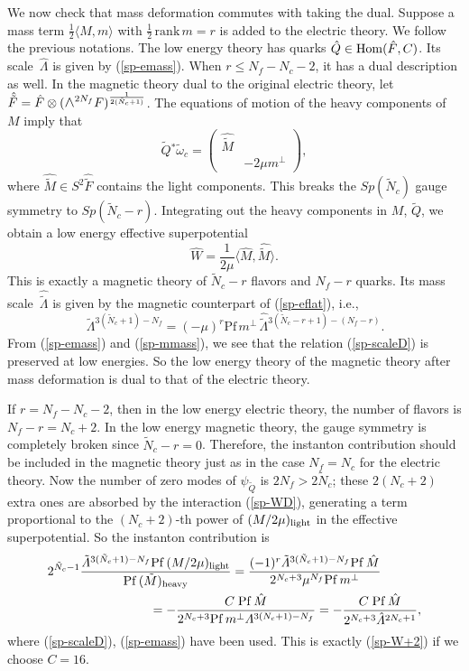 \documentclass[lecture]{qft-l}
\newcommand{\om}{\omega}
\newcommand{\Lam}{\varLambda}
\newcommand{\medwedge}{\mbox{\fontsize{12pt}{0pt}\selectfont $\wedge$}}
\newcommand{\Hom}{{\rm Hom}}
\newcommand{\bra}{\langle}
\newcommand{\ket}{\rangle}
\newcommand{\inv}[1]{\frac{1}{#1}}
\newcommand{\hf}{{\textstyle \inv{2}}}
\newcommand{\rank}{\mathrm{\,rank\,}}
\newcommand{\Pf}{\mathrm{Pf\,}}
\newcommand{\hLam}{\,\hat{\!\Lam}{}}
\newcommand{\tLam}{\,\tilde{\!\Lam}{}}
\newcommand{\htLam}{\,\hat{\tilde{\!\Lam}}{}}
\newcommand{\hF}{\hat{F}{}}
\newcommand{\tM}{\tilde{M}{}}
\newcommand{\tQ}{\tilde{Q}{}}
\newcommand{\tN}{\tilde{N}_c}
\newcommand{\htF}{\hat{\tilde{F}}{}}
\newcommand{\htM}{\hat{\tilde{M}}{}}
\newcommand{\hM}{\hat{M}{}}
\newcommand{\hQ}{\hat{Q}{}}
\newcommand{\tom}{\tilde{\om}_c}
\newcommand{\four}[4]{\left(	\begin{array}{cc}
				{#1}	&	{#2}	\\
				{#3}	&	{#4}
				\end{array}   \right)}
\begin{document}
We now check that mass deformation commutes with taking the dual.
Suppose a mass term $\hf\bra M,m\ket$ with $\hf\rank m=r$
is added to the electric theory.
We follow the previous notations.
The low energy theory has quarks $\hQ\in\Hom(\hF,C)$.
Its scale $\hLam$ is given by (\ref{sp-emass}).
When $r\le N_f-N_c-2$, it has a dual description as well.
In the magnetic theory dual to the original electric theory, let 
$\htF=\hF\otimes(\medwedge^{2N_f}F)^{\inv{2(\tN+1)}}$.
The equations of motion of the heavy components of $M$ imply that
	\begin{equation}
\tQ^*\tom=\four{\htM}{}{}{-2\mu m^\perp},
	\end{equation}
where $\htM\in S^2\htF$ contains the light components.
This breaks the $Sp(\tN)$ gauge symmetry to $Sp(\tN-r)$.
Integrating out the heavy components in $M$, $\tQ$, we obtain
a low energy effective superpotential
	\begin{equation}\label{sp-Wmass}
\hat{W}=\inv{2\mu}\bra\hat{M},\hat{\tilde{M}}\ket.
	\end{equation}
This is exactly a magnetic theory of $\tN-r$ flavors and $N_f-r$ quarks.
Its mass scale $\htLam$ is given by the magnetic counterpart of 
(\ref{sp-eflat}), i.e.,
	\begin{equation}\label{sp-mmass}
\tLam^{3(\tN+1)-N_f}=(-\mu)^r\Pf m^\perp\htLam^{3(\tN-r+1)-(N_f-r)}.
	\end{equation}
{}From (\ref{sp-emass}) and (\ref{sp-mmass}),
we see that the relation (\ref{sp-scaleD}) is preserved at low energies.
So the low energy theory of the magnetic theory after mass deformation is
dual to that of the electric theory.

If $r=N_f-N_c-2$, then in the low energy electric theory, the number of 
flavors is $N_f-r=N_c+2$.
In the low energy magnetic theory, the gauge symmetry is completely 
broken since $\tN-r=0$.
Therefore, the instanton contribution should be included in the magnetic
theory just as in the case $N_f=N_c$ for the electric theory.
Now the number of zero modes of $\psi_{\tQ}$ is $2N_f>2\tN$;
these $2(N_c+2)$ extra ones are absorbed by the interaction (\ref{sp-WD}),
generating a term proportional to the $(N_c+2)$-th power
of $(M/2\mu)_{\rm light}$ in the effective superpotential.
So the instanton contribution is
\begin{align}\label{part2}
2^{\tN-1}\frac{\tLam^{3(\tN+1)-N_f}\Pf(M/2\mu)_{\mathrm{light}}}
{\Pf(\tM)_{\mathrm{heavy}}}
&=\frac{(-1)^r\tLam^{3(\tN+1)-N_f}
  \Pf\hM}{2^{N_c+3}\mu^{N_f}\Pf m^\perp}\\
&\null\kern-65pt
=-\frac{C\;\Pf\hM}{2^{N_c+3}\Pf m^\perp\Lam^{3(N_c+1)-N_f}}
=-\frac{C\;\Pf\hM}{2^{N_c+3}\hLam^{2N_c+1}},\nonumber
\end{align}
where (\ref{sp-scaleD}), (\ref{sp-emass}) have been used.
This is exactly (\ref{sp-W+2}) if we choose $C=16$.
\end{document}
